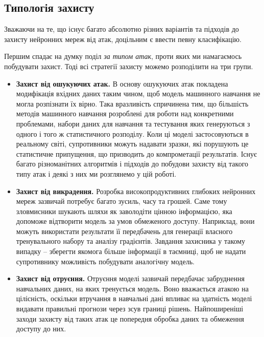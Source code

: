 \documentclass[14pt,a4paper]{extarticle}
\newcounter{e}
\numberwithin{equation}{section}
\numberwithin{figure}{section}
\begin{document}
 
 
 
 
 \subsection{Типологія захисту}
 Зважаючи на те, що існує багато абсолютно різних варіантів та підходів до захисту нейронних мереж від атак, доцільним є ввести певну класифікацію.
 
 Першим спадає на думку поділ \textit{за типом атак}, проти яких ми намагаємось побудувати захист. Тоді всі стратегії захисту можемо розподілити на три групи. 
 
 \begin{itemize}
 	\item \textbf{Захист від ошукуючих атак.} 
 	В основу ошукуючих атак покладена модифікація вхідних даних таким чином, щоб модель машинного навчання не могла розпізнати їх вірно. Така вразливість спричинена тим, що більшість методів машинного навчання розроблені для роботи над конкретними проблемами, набори даних для навчання та тестування яких генеруються з одного і того ж статистичного розподілу. Коли ці моделі застосовуються в реальному світі, супротивники можуть надавати зразки, які порушують це статистичне припущення, що призводить до компрометації результатів. Існує багато різноманітних алгоритмів і підходів до побудови захисту від такого типу атак і деякі з них ми розглянемо у цій роботі.
 	
 	\item \textbf{Захист від викрадення.}
 	Розробка високопродуктивних глибоких нейронних мереж зазвичай потребує багато зусиль, часу та грошей. Саме тому зловмисники шукають шляхи як заволодіти цінною інформацією, яка допоможе відтворити модель за умов обмеженого доступу. Наприклад, вони можуть використати результати її передбачень для генерації власного тренувального набору та аналізу градієнтів. Завдання захисника у такому випадку -- зберегти якомога більше інформації в таємниці, щоб не надати супротивнику можливість побудувати аналогічну модель.
 	
 	\item \textbf{Захист від отруєння.}
 	Отруєння моделі зазвичай передбачає забруднення навчальних даних, на яких тренується модель. Воно вважається атакою на цілісність, оскільки втручання в навчальні дані впливає на здатність моделі видавати правильні прогнози через зсув границі рішень. Найпоширеніші заходи захисту від таких атак це попередня обробка даних та обмеження доступу до них.
 \end{itemize}
 
\end{document}
